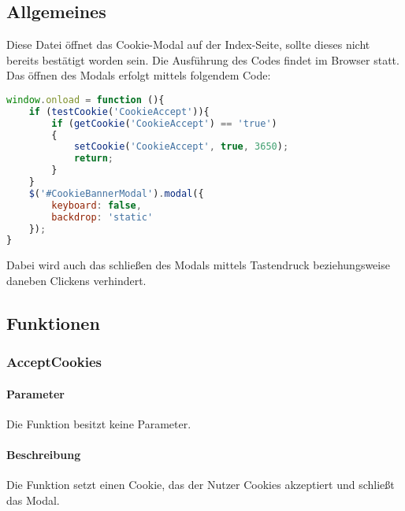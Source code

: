 \subsection{Allgemeines} Diese Datei öffnet das Cookie-Modal auf der Index-Seite, sollte dieses nicht bereits bestätigt worden sein.
Die Ausführung des Codes findet im Browser statt. Das öffnen des Modals erfolgt mittels folgendem Code:
\begin{lstlisting}[language=JavaScript]
window.onload = function (){
	if (testCookie('CookieAccept')){
		if (getCookie('CookieAccept') == 'true')
		{
			setCookie('CookieAccept', true, 3650);
			return;
		}
	}
	$('#CookieBannerModal').modal({
		keyboard: false,
		backdrop: 'static'
	});
}
\end{lstlisting}
Dabei wird auch das schließen des Modals mittels Tastendruck beziehungsweise daneben Clickens verhindert.
\subsection{Funktionen}
\subsubsection{AcceptCookies}
\paragraph{Parameter} Die Funktion besitzt keine Parameter.
\paragraph{Beschreibung} Die Funktion setzt einen Cookie, das der Nutzer Cookies akzeptiert und schließt das Modal.
